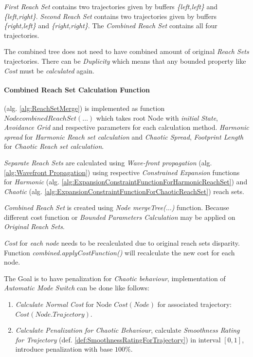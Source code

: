 \noindent\emph{First Reach Set} contains two trajectories given by buffers \emph{\{left,left\}} and \emph{\{left,right\}}. \emph{Second Reach Set} contains two trajectories given by buffers \emph{\{right,left\}} and \emph{\{right,right\}}. The \emph{Combined Reach Set} contains all four trajectories.

\begin{note}
    The combined tree \cite{o1996log} does not need to have combined amount of original \emph{Reach Sets} trajectories. There can be \emph{Duplicity} which means that any bounded property like \emph{Cost} must be \emph{calculated} again.
\end{note}

\paragraph{Combined Reach Set Calculation Function} (alg. \ref{alg:ReachSetMerge}) is implemented as function $Node combinedReachSet(\dots)$ which takes root Node with \emph{initial State}, \emph{Avoidance Grid} and respective parameters for each calculation method. \emph{Harmonic spread} for \emph{Harmonic Reach set calculation} and \emph{Chaotic Spread}, \emph{Footprint Length} for \emph{Chaotic Reach set calculation}.

\emph{Separate Reach Sets} are calculated using \emph{Wave-front propagation} (alg. \ref{alg:Wavefront Propagation}) using respective \emph{Constrained Expansion} functions for \emph{Harmonic} (alg. \ref{alg:ExpansionConstraintFunctionForHarmonicReachSet}) and \emph{Chaotic} (alg. \ref{alg:ExpansionConstraintFunctionForChaoticReachSet}) reach sets.

\emph{Combined Reach Set} is created using \emph{Node mergeTree($\dots$)} function. Because different cost function or \emph{Bounded Parameters Calculation} may be applied on \emph{Original Reach Sets}.

\emph{Cost} for \emph{each node} needs to be recalculated due to original reach sets disparity. Function \emph{combined.applyCostFunction()} will recalculate the new cost for each node. 

The Goal is to have penalization for \emph{Chaotic behaviour}, implementation of \emph{Automatic Mode Switch} can be done like follows:
\begin{enumerate}
    \item \emph{Calculate Normal Cost} for Node $Cost(Node)$ for associated trajectory:\\ $Cost(Node.Trajectory)$.
    \item \emph{Calculate Penalization for \emph{Chaotic Behaviour}}, calculate \emph{Smoothness Rating for Trajectory} (def. \ref{def:SmoothnessRatingForTrajectory}) in interval $[0,1]$, introduce penalization with base $100 \%$.
\end{enumerate}

